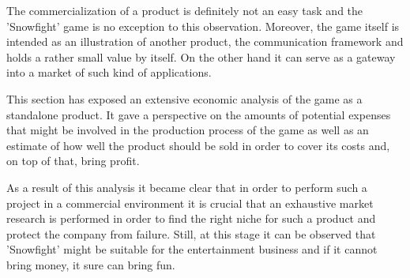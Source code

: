 The commercialization of a product is definitely not an easy task and the
'Snowfight' game is no exception to this observation. Moreover, the game
itself is intended as an illustration of another product, the communication
framework and holds a rather small value by itself. On the other hand it can
serve as a gateway into a market of such kind of applications.

This section has exposed an extensive economic analysis of the game as a
standalone product. It gave a perspective on the amounts of potential expenses
that might be involved in the production process of the game as well as an
estimate of how well the product should be sold in order to cover its costs
and, on top of that, bring profit.

As a result of this analysis it became clear that in order to perform such a
project in a commercial environment it is crucial that an exhaustive market
research is performed in order to find the right niche for such a product and
protect the company from failure. Still, at this stage it can be observed that
'Snowfight' might be suitable for the entertainment business and if it cannot
bring money, it sure can bring fun.

\clearpage
